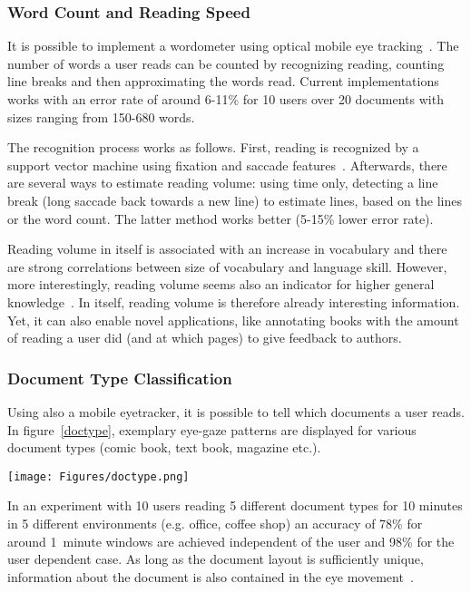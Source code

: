 \documentclass[journal]{IEEEtran}
\begin{document}
\begin{figure*}
\subsubsection{Word Count and Reading Speed}
It is possible to implement a wordometer using optical mobile eye tracking~\cite{icdar1}. 
The number of words a user reads can be counted by recognizing reading, counting line breaks and then approximating the words read. 
Current implementations works with an error rate of around 6-11\% for 10 users over 20 documents with sizes ranging from 150-680 words.

The recognition process works as follows. 
First, reading is recognized by a support vector machine using fixation and saccade features~\cite{icdar1}. 
Afterwards, there are several ways to estimate reading volume: using time only, detecting a line break (long saccade back towards a new line) to estimate lines, based on the lines or the word count.
The latter method works better (5-15\% lower error rate).

Reading volume in itself is associated with an increase in vocabulary and there are strong correlations between size of vocabulary and language skill.
However, more interestingly, reading volume seems also an indicator for higher general knowledge~\cite{cunningham2001reading}. 
In itself, reading volume is therefore already interesting information. 
Yet, it can also enable novel applications, like annotating books with the amount of reading a user did (and at which pages) to give feedback to authors.

\subsubsection{Document Type Classification}
Using also a mobile eyetracker, it is possible to tell which documents a user reads. 
In figure~\ref{doctype}, exemplary eye-gaze patterns are displayed for various document types (comic book, text book, magazine etc.). 
\begin{figure*}
    \centering
    \texttt{[image: Figures/doctype.png]}
   \caption{Examples for different eye gaze patterns for varying document types (Texbook, novel, magazine, newspaper, manga)}
   \label{doctype}
\end{figure*}
In an experiment with 10 users reading 5 different document types for 10 minutes in 5 different environments (e.g. office, coffee shop) an accuracy of 78\% for around 1~minute windows are achieved independent of the user and 98\% for the user dependent case.
As long as the document layout is sufficiently unique, information about the document is also contained in the eye movement~\cite{kunze2013know}.


\end{figure*}
\end{document}
